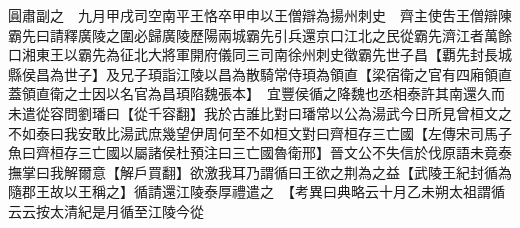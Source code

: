 圓肅副之　九月甲戌司空南平王恪卒甲申以王僧辯為揚州刺史　齊主使吿王僧辯陳霸先曰請釋廣陵之圍必歸廣陵歷陽兩城霸先引兵還京口江北之民從霸先濟江者萬餘口湘東王以霸先為征北大將軍開府儀同三司南徐州刺史徵霸先世子昌【覇先封長城縣侯昌為世子】及兄子頊詣江陵以昌為散騎常侍頊為領直【梁宿衛之官有四廂領直蓋領直衛之士因以名官為昌頊陷魏張本】　宜豐侯循之降魏也丞相泰許其南還久而未遣從容問劉璠曰【從千容翻】我於古誰比對曰璠常以公為湯武今日所見曾桓文之不如泰曰我安敢比湯武庶幾望伊周何至不如桓文對曰齊桓存三亡國【左傳宋司馬子魚曰齊桓存三亡國以屬諸侯杜預注曰三亡國魯衛邢】晉文公不失信於伐原語未竟泰撫掌曰我解爾意【解戶買翻】欲激我耳乃謂循曰王欲之荆為之益【武陵王紀封循為隨郡王故以王稱之】循請還江陵泰厚禮遣之　【考異曰典略云十月乙未朔太祖謂循云云按太清紀是月循至江陵今從